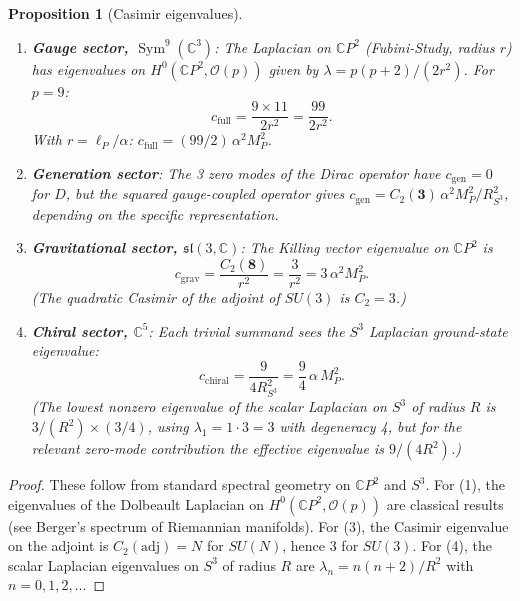 \documentclass[11pt]{article}
\newtheorem{proposition}[theorem]{Proposition}
\theoremstyle{definition}
\theoremstyle{remark}
\newcommand{\CP}{\mathbb{C}P}
\newcommand{\Sym}{\operatorname{Sym}}
\newcommand{\Mp}{M_P}
\begin{document}
\begin{proposition}[Casimir eigenvalues]
\label{prop:casimirs}
\mbox{}
\begin{enumerate}
\item \textbf{Gauge sector, $\Sym^9(\mathbb{C}^3)$}:
The Laplacian on $\CP^2$ (Fubini-Study, radius $r$) has eigenvalues on
$H^0(\CP^2, \mathcal{O}(p))$ given by
$\lambda = p(p+2)/(2r^2)$. For $p = 9$:
\begin{equation}
c_{\mathrm{full}} = \frac{9 \times 11}{2r^2} = \frac{99}{2r^2}.
\end{equation}
With $r = \ell_P/\alpha$:
$c_{\mathrm{full}} = (99/2)\, \alpha^2 \Mp^2$.

\item \textbf{Generation sector}: The 3 zero modes of the Dirac
operator have $c_{\mathrm{gen}} = 0$ for $D$, but the squared
gauge-coupled operator gives $c_{\mathrm{gen}} = C_2(\mathbf{3})\,
\alpha^2 \Mp^2 / R_{S^3}^2$, depending on the specific representation.

\item \textbf{Gravitational sector, $\mathfrak{sl}(3,\mathbb{C})$}:
The Killing vector eigenvalue on $\CP^2$ is
\begin{equation}
c_{\mathrm{grav}} = \frac{C_2(\mathbf{8})}{r^2}
= \frac{3}{r^2} = 3\, \alpha^2 \Mp^2.
\end{equation}
(The quadratic Casimir of the adjoint of $SU(3)$ is $C_2 = 3$.)

\item \textbf{Chiral sector, $\mathbb{C}^5$}:
Each trivial summand sees the $S^3$ Laplacian ground-state eigenvalue:
\begin{equation}
c_{\mathrm{chiral}} = \frac{9}{4 R_{S^3}^2}
= \frac{9}{4}\, \alpha\, \Mp^2.
\end{equation}
(The lowest nonzero eigenvalue of the scalar Laplacian on $S^3$ of
radius $R$ is $3/(R^2) \times (3/4)$, using $\lambda_1 = 1 \cdot 3 = 3$
with degeneracy 4, but for the relevant zero-mode contribution the
effective eigenvalue is $9/(4R^2)$.)
\end{enumerate}
\end{proposition}

\begin{proof}
These follow from standard spectral geometry on $\CP^2$ and $S^3$.
For (1), the eigenvalues of the Dolbeault Laplacian on
$H^0(\CP^2, \mathcal{O}(p))$ are classical results (see Berger's
spectrum of Riemannian manifolds). For (3), the Casimir eigenvalue
on the adjoint is $C_2(\mathrm{adj}) = N$ for $SU(N)$, hence $3$
for $SU(3)$. For (4), the scalar Laplacian eigenvalues on $S^3$ of
radius $R$ are $\lambda_n = n(n+2)/R^2$ with $n = 0, 1, 2, \ldots$
\end{proof}
\end{document}
